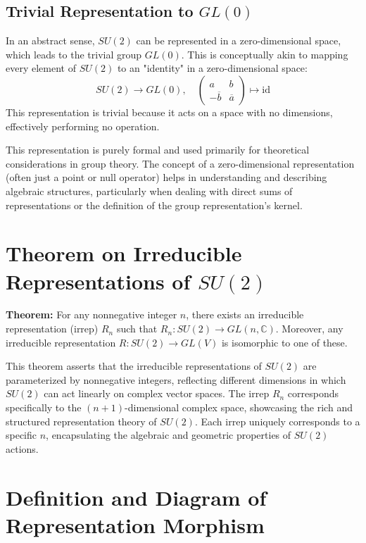 \documentclass{article}
\begin{document}
\subsection*{Trivial Representation to \(GL(0)\)}
In an abstract sense, \(SU(2)\) can be represented in a zero-dimensional space, which leads to the trivial group \(GL(0)\). This is conceptually akin to mapping every element of \(SU(2)\) to an "identity" in a zero-dimensional space:
\[
SU(2) \rightarrow GL(0), \quad \begin{pmatrix} a & b \\ -\overline{b} & \overline{a} \end{pmatrix} \mapsto \text{id}
\]
This representation is trivial because it acts on a space with no dimensions, effectively performing no operation.

This representation is purely formal and used primarily for theoretical considerations in group theory. The concept of a zero-dimensional representation (often just a point or null operator) helps in understanding and describing algebraic structures, particularly when dealing with direct sums of representations or the definition of the group representation's kernel.

\section*{Theorem on Irreducible Representations of \(SU(2)\)}

\textbf{Theorem:}
For any nonnegative integer \( n \), there exists an irreducible representation (irrep) \( R_n \) such that \( R_n: SU(2) \rightarrow GL(n, \mathbb{C}) \). Moreover, any irreducible representation \( R: SU(2) \rightarrow GL(V) \) is isomorphic to one of these.

This theorem asserts that the irreducible representations of \(SU(2)\) are parameterized by nonnegative integers, reflecting different dimensions in which \(SU(2)\) can act linearly on complex vector spaces. The irrep \( R_n \) corresponds specifically to the \( (n+1) \)-dimensional complex space, showcasing the rich and structured representation theory of \( SU(2) \). Each irrep uniquely corresponds to a specific \( n \), encapsulating the algebraic and geometric properties of \( SU(2) \) actions.

\section*{Definition and Diagram of Representation Morphism}
\end{document}

